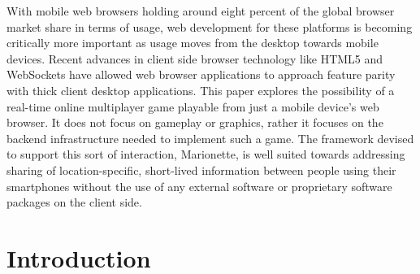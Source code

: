 \documentclass[12pt]{report}	%
\theoremstyle{definition}
\theoremstyle{remark}
\begin{document}
%
\utabstract
{}%
\indent
With mobile web browsers holding around eight percent of the global
browser market share in terms of usage, web development for these
platforms is becoming critically more important as usage moves from the
desktop towards mobile devices. Recent advances in client side browser
technology like HTML5 and WebSockets have allowed web browser
applications to approach feature parity with thick client desktop
applications. This paper explores the possibility of a real-time online
multiplayer game playable from just a mobile device's web browser. It
does not focus on gameplay or graphics, rather it focuses on the backend
infrastructure needed to implement such a game. The framework devised to
support this sort of interaction, Marionette, is well suited towards
addressing sharing of location-specific, short-lived information between
people using their smartphones without the use of any external software
or proprietary software packages on the client side.



\tableofcontents   %

\listoftables      %
\listoffigures     %

%
%

\chapter{Introduction}
\end{document}
